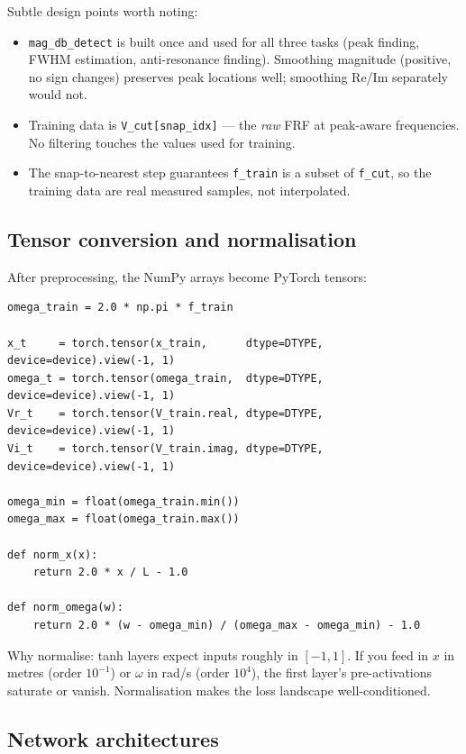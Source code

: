 \documentclass[11pt,a4paper]{article}
\begin{document}
Subtle design points worth noting:
\begin{itemize}[leftmargin=*, itemsep=2pt]
\item \texttt{mag\_db\_detect} is built once and used for all three tasks (peak finding, FWHM estimation, anti-resonance finding). Smoothing magnitude (positive, no sign changes) preserves peak locations well; smoothing Re/Im separately would not.
\item Training data is \texttt{V\_cut[snap\_idx]} --- the \emph{raw} FRF at peak-aware frequencies. No filtering touches the values used for training.
\item The snap-to-nearest step guarantees \texttt{f\_train} is a subset of \texttt{f\_cut}, so the training data are real measured samples, not interpolated.
\end{itemize}

\subsection{Tensor conversion and normalisation}

After preprocessing, the NumPy arrays become PyTorch tensors:

\begin{lstlisting}[caption={Tensor conversion and input normalisation}]
omega_train = 2.0 * np.pi * f_train

x_t     = torch.tensor(x_train,      dtype=DTYPE, device=device).view(-1, 1)
omega_t = torch.tensor(omega_train,  dtype=DTYPE, device=device).view(-1, 1)
Vr_t    = torch.tensor(V_train.real, dtype=DTYPE, device=device).view(-1, 1)
Vi_t    = torch.tensor(V_train.imag, dtype=DTYPE, device=device).view(-1, 1)

omega_min = float(omega_train.min())
omega_max = float(omega_train.max())

def norm_x(x):
    return 2.0 * x / L - 1.0

def norm_omega(w):
    return 2.0 * (w - omega_min) / (omega_max - omega_min) - 1.0
\end{lstlisting}

Why normalise: tanh layers expect inputs roughly in $[-1, 1]$. If you feed in $x$ in metres (order $10^{-1}$) or $\omega$ in rad/s (order $10^4$), the first layer's pre-activations saturate or vanish. Normalisation makes the loss landscape well-conditioned.

\subsection{Network architectures}
\end{document}

